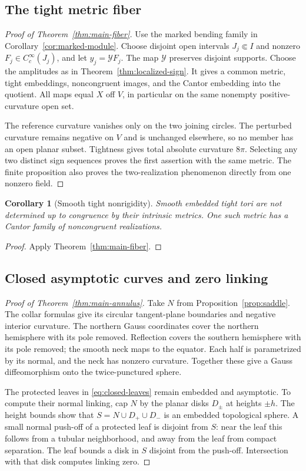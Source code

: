 \documentclass[11pt]{amsart}
\newtheorem{corollary}[theorem]{Corollary}
\theoremstyle{definition}
\theoremstyle{remark}
\numberwithin{equation}{section}
\begin{document}
\subsection{The tight metric fiber}\label{sec:tight-main}
\begin{proof}[Proof of Theorem~\ref{thm:main-fiber}]
Use the marked bending family in Corollary~\ref{cor:marked-module}. Choose disjoint
open intervals $J_j\Subset I$ and nonzero $F_j\in C_c^\infty(J_j)$, and let
$y_j=\mathcal YF_j$. The map $\mathcal Y$ preserves disjoint supports. Choose the
amplitudes as in Theorem~\ref{thm:localized-sign}. It gives a common metric,
tight embeddings, noncongruent images, and the Cantor embedding into the
quotient. All maps equal $X$ off $V$, in particular on the same nonempty
positive-curvature open set.

The reference curvature vanishes only on the two joining circles.
The perturbed curvature remains negative on $V$ and is unchanged elsewhere,
so no member has an open planar subset. Tightness gives total absolute
curvature $8\pi$. Selecting any two distinct sign sequences proves the
first assertion with the same metric. The finite proposition also proves
the two-realization phenomenon directly from one nonzero field.
\end{proof}

\begin{corollary}[Smooth tight nonrigidity]\label{cor:tight-nonrigidity}
Smooth embedded tight tori are not determined up to congruence by their
intrinsic metrics. One such metric has a Cantor family of noncongruent
realizations.
\end{corollary}
\begin{proof}
Apply Theorem~\ref{thm:main-fiber}.
\end{proof}

\subsection{Closed asymptotic curves and zero linking}
\begin{proof}[Proof of Theorem~\ref{thm:main-annulus}]
Take $N$ from Proposition~\ref{prop:saddle}. The collar formulas give
its circular tangent-plane boundaries and negative interior curvature.
The northern Gauss coordinates cover the northern hemisphere with its
pole removed. Reflection covers the southern hemisphere with its pole
removed; the smooth neck maps to the equator. Each half is parametrized
by its normal, and the neck has nonzero curvature. Together these give
a Gauss diffeomorphism onto the twice-punctured sphere.

The protected leaves in \eqref{eq:closed-leaves} remain embedded and
asymptotic. To compute their normal linking, cap $N$ by the planar disks
$D_\pm$ at heights $\pm h$. The height bounds show that
$S=N\cup D_+\cup D_-$ is an embedded topological sphere.
A small normal push-off of a protected leaf is disjoint from $S$:
near the leaf this follows from a tubular neighborhood, and away from
the leaf from compact separation. The leaf bounds a disk in $S$ disjoint
from the push-off. Intersection with that disk computes linking zero.
\end{proof}
\end{document}

